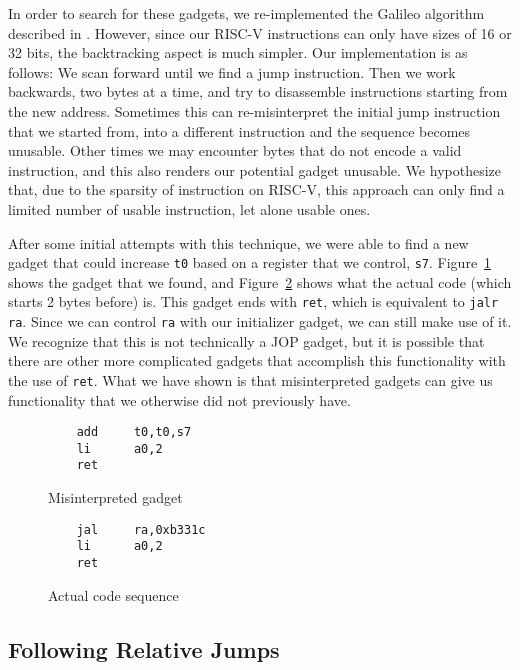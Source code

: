 In order to search for these gadgets, we re-implemented the Galileo algorithm
described in \cite{shacham07ropx86}. However, since our RISC-V instructions can
only have sizes of 16 or 32 bits, the backtracking aspect is much simpler. Our
implementation is as follows: We scan forward until we find a jump instruction.
Then we work backwards, two bytes at a time, and try to disassemble instructions
starting from the new address. Sometimes this can re-misinterpret the initial
jump instruction that we started from, into a different instruction and the
sequence becomes unusable. Other times we may encounter bytes that do not encode
a valid instruction, and this also renders our potential gadget unusable. We
hypothesize that, due to the sparsity of instruction on RISC-V, this approach
can only find a limited number of usable instruction, let alone usable ones.

After some initial attempts with this technique, we were able to find a new
gadget that could increase \verb|t0| based on a register that we control,
\verb|s7|. Figure~\ref{misinterpreted gadget} shows the gadget that we found,
and Figure~\ref{actual code sequence} shows what the actual code (which starts
2 bytes before) is. This gadget ends with \verb|ret|, which is equivalent to
\verb|jalr ra|. Since we can control \verb|ra| with our initializer gadget, we
can still make use of it. We recognize that this is not technically a JOP
gadget, but it is possible that there are other more complicated gadgets that
accomplish this functionality with the use of \verb|ret|. What we have shown is
that misinterpreted gadgets can give us functionality that we otherwise did not
previously have.

\begin{figure}
    \caption{Misinterpreted gadget}
    \label{misinterpreted gadget}
    \begin{lstlisting}
    add     t0,t0,s7
    li      a0,2
    ret
    \end{lstlisting}
\end{figure}
\begin{figure}
    \caption{Actual code sequence}
    \label{actual code sequence}
    \begin{lstlisting}
    jal     ra,0xb331c
    li      a0,2
    ret
    \end{lstlisting}
\end{figure}

\subsection{Following Relative Jumps}

